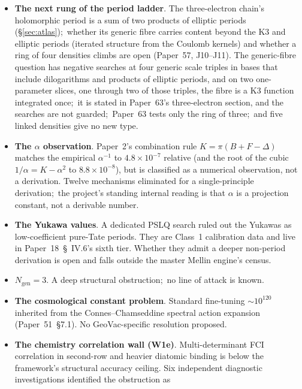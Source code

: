 \documentclass[11pt,a4paper]{article}
\newcommand{\gvc}[2]{#2}
\begin{document}
\begin{itemize}
  \item \textbf{The next rung of the period ladder}.  The
    three-electron chain's holomorphic period is a sum of two products
    of elliptic periods (\S\ref{sec:atlas});\ whether its generic fibre
    carries content beyond the K3 and elliptic periods (iterated
    structure from the Coulomb kernels) and whether a ring of four
    densities climbs are open (Paper~57, J10--J11).  The
    generic-fibre question has negative searches at four generic scale
    triples in bases that include dilogarithms and products of elliptic
    periods, and on two one-parameter slices, one through two of those
    triples, the fibre is a K3 function integrated once;\ it is stated in Paper~63's three-electron section, and the
    searches are not guarded;\ Paper~63
    tests only the ring of three;\ and five linked densities give no new
    type.
  \item \textbf{The $\alpha$ observation}.  \gvc{k-combination-rule}{Paper~2's combination rule
    $K = \pi(B + F - \Delta)$ matches the empirical $\alpha^{-1}$ to
    $4.8\times 10^{-7}$ relative (and the root of the cubic
    $1/\alpha = K - \alpha^2$ to $8.8 \times 10^{-8}$), but is classified as a
    numerical observation, not a derivation}.  Twelve mechanisms
    eliminated for a single-principle derivation;\ the project's
    standing internal reading is that $\alpha$ is a projection
    constant, not a derivable number.
  \item \textbf{The Yukawa values}.  A dedicated PSLQ search
    ruled out the Yukawas as low-coefficient pure-Tate periods.  They
    are Class~1 calibration data and live in Paper~18~\S~IV.6's sixth
    tier.  Whether they admit a deeper non-period derivation is open
    and falls outside the master Mellin engine's census.
  \item \textbf{$N_{\mathrm{gen}} = 3$}.  A deep structural
    obstruction;\ no line of attack is known.
  \item \textbf{The cosmological constant problem}.  Standard fine-tuning
    $\sim 10^{120}$ inherited from the Connes--Chamseddine spectral
    action expansion (Paper~51~\S7.1).  No GeoVac-specific resolution
    proposed.
  \item \textbf{The chemistry correlation wall (W1e)}.  Multi-determinant FCI correlation
    in second-row and heavier diatomic binding is below the
    framework's structural accuracy ceiling.  Six independent
    diagnostic investigations identified the obstruction as

\end{itemize}
\end{document}
